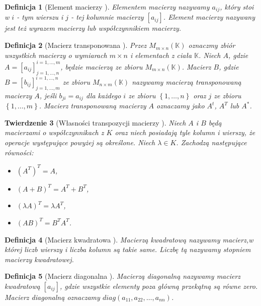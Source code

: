 \documentclass[12pt,a4paper]{report}
\newtheorem{df}{Definicja}[chapter]
\newtheorem{tw}[df]{Twierdzenie}
\newcommand{\set}[1]{\left\lbrace {#1} \right\rbrace}
\newcommand{\setK}{\mathbb{K}}
\begin{document}
\begin{df}[Element macierzy {\citep[Sec 8.1]{alzega}}]
Elementem macierzy nazywamy $a_{ij}$, który stoi w $i$ - tym wierszu i $j$ - tej kolumnie macierzy $[a_{ij}]$. Element macierzy nazywany jest też wyrazem macierzy lub współczynnikiem macierzy.
\end{df}

\begin{df}[Macierz transponowana {\citep[Sec 8.1 ]{alzega}}]
Przez $M_{m \times n}(\setK)$ oznaczmy zbiór wszystkich macierzy o wymiarach $m \times n$ i elementach z ciała $\setK$.
Niech $A$, gdzie $A = [a_{ij}]_{j = 1, \ldots, n}^{i = 1, \ldots , m}$, będzie macierzą ze zbioru $M_{m \times n}(\setK)$.
Macierz $B$, gdzie $B = [b_{ij}]_{j = 1, \ldots, m}^{i = 1, \ldots , n}$ ze zbioru $M_{n \times m}(\setK)$ nazywamy macierzą transponowaną macierzy $A$, jeśli $b_{ji} = a_{ij}$ dla każdego $i$ ze zbioru $\set{1, \ldots, n}$ oraz $j$ ze zbioru $\set{1, \ldots ,m}$. Macierz transponowaną macierzy $A$ oznaczamy jako $A^t$, $A^T$ lub $A^*$.
\end{df}

\begin{tw}[Własności transpozycji macierzy {\citep[Sec 5.1 Tw. 5.1]{ealIII}}]
Niech $A$ i $B$ będą macierzami o współczynnikach z $K$ oraz niech posiadają tyle kolumn i wierszy, że operacje występujące powyżej są określone. Niech $\lambda \in K$.
Zachodzą następujące równości:
\begin{itemize}
\item $(A^T)^T = A$,
\item $(A + B)^T = A^T + B^T$,
\item $(\lambda A)^T = \lambda A^T$,
\item $(AB)^T = B^T A^T$.
\end{itemize}
\end{tw}

\begin{df}[Macierz kwadratowa {\citep[Sec 8.1]{alzega}}]
Macierzą kwadratową nazywamy macierz,w której liczb wierszy i liczba kolumn są takie same. Liczbę tą nazywamy stopniem macierzy kwadratowej.
\end{df}

\begin{df}[Macierz diagonalna {\citep[Sec 8.1]{alzega}}]
Macierzą diagonalną nazywamy macierz kwadratową $[a_{ij}]$, gdzie wszystkie elementy poza główną przekątną są równe zero. Macierz diagonalną oznaczamy $diag(a_{11}, a_{22}, \ldots , a_{nn})$.
\end{df}
\end{document}
